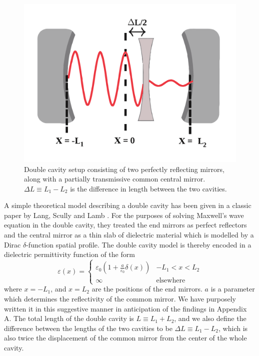 \documentclass[twocolumn,english,pra,aps,superscriptaddress,floatfix]{revtex4-1}
\begin{document}
\begin{figure}
\includegraphics[width=1\columnwidth]{CavitySetupNew.pdf}
\caption{Double cavity setup consisting
of two perfectly reflecting mirrors, along with a partially transmissive common central mirror. $\Delta L \equiv L_{1}-L_{2}$ is the difference in length between the two cavities.}
\label{fig:cavitysetup}
\end{figure}

A simple theoretical model describing a double cavity has been given in a classic paper by 
Lang, Scully and Lamb \cite{lang73}. For the purposes of solving Maxwell's wave equation in the double cavity, they treated the end mirrors as perfect reflectors and the central mirror as a thin slab of dielectric material which is modelled by a Dirac $\delta$-function spatial profile. The double cavity model is thereby encoded in a dielectric permittivity function of the form
 \begin{equation}
\varepsilon(x)=\begin{cases}
\varepsilon_{0}(1+\frac{a}{\varepsilon_{0}} \delta(x)) & -L_{1}<x<L_{2}\\
\infty & \mbox{elsewhere}\end{cases}
\label{perm}
\end{equation}
where $x=-L_{1}$, and $x=L_{2}$ are the positions of the end mirrors. $a$ is a parameter which determines the reflectivity of the common mirror.  We have purposely written it in this suggestive manner in anticipation of the findings in Appendix A. The total length of the double cavity is $L \equiv L_{1}+L_{2}$, and we also define the difference between the lengths of the two cavities to be $\Delta L \equiv L_{1}-L_{2}$,  which is also twice the displacement of the common mirror from the center of the whole cavity. 
\end{document}
